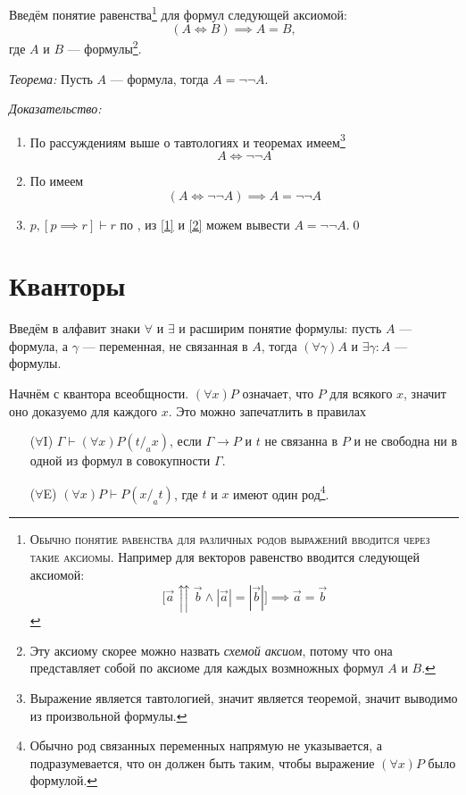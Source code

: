 Введём понятие равенства\footnote{
	\textsc{Обычно понятие равенства для различных родов выражений
		вводится через такие аксиомы.}
	Например для векторов равенство вводится следующей аксиомой:
	\[
		\big[\vec{a}\upuparrows\vec{b}\land|\vec{a}|=|\vec{b}|\big]
		\implies \vec{a}=\vec{b}
	\]
} для формул следующей аксиомой:
\[
	(A\iff B)\implies A=B,
\]
где $A$ и $B$ --- формулы\footnote{
Эту аксиому скорее можно назвать {\it схемой аксиом}, потому что она представляет
собой по аксиоме для каждых возмножных формул $A$ и $B$.
}.

{\it Теорема:} Пусть $A$ --- формула, тогда $A=\lnot\lnot A$.

	{\it Доказательство:}
\begin{enumerate}[label=(\arabic*)]
	\item{}\label{1}По рассуждениям выше о тавтологиях и теоремах
	имеем\footnote{Выражение является тавтологией, значит является теоремой,
		значит выводимо из произвольной формулы.}
	\[
		A\iff\lnot\lnot A
	\]

	\item{}\label{2}По \axiom{} имеем
	\[
		(A\iff \lnot\lnot A)\implies A=\lnot\lnot A
	\]
	\item{}\label{3}${p,[p\implies r]\vdash r}$ по \taut{},
	из \ref{1} и \ref{2}
	можем вывести $A=\lnot\lnot A$.\qed
\end{enumerate}


\section{Кванторы}

\newcommand\Aii{$\forall$I}
\newcommand\Aee{$\forall$E}
\newcommand\Eii{$\exists$I}
\newcommand\Eee{$\exists$E}

Введём в алфавит знаки $\forall$ и $\exists$ и расширим понятие формулы:
пусть $A$ --- формула, а $\gamma$ --- переменная, не связанная в $A$,
тогда $(\forall\gamma)A$ и $\exists\gamma:A$ --- формулы.

Начнём с квантора всеобщности. $(\forall x)P$ означает, что $P$ для
всякого $x$, значит оно доказуемо для каждого $x$. Это можно запечатлить
в правилах
\begin{enumerate}
	\item[(\Aii{})]{}$\Gamma\vdash(\forall x)P(t/_{a}x)$, если $\Gamma\to P$ и $t$
	не связанна в $P$ и
	не свободна ни в одной из формул в совокупности $\Gamma$.

	\item[(\Aee{})]{}$(\forall x)P\vdash P(x/_{a}t)$, где $t$ и $x$
	имеют один род\footnote{
		Обычно род связанных переменных напрямую не указывается, а подразумевается,
		что он должен быть таким, чтобы выражение $(\forall x)P$ было формулой.
	}.
\end{enumerate}

